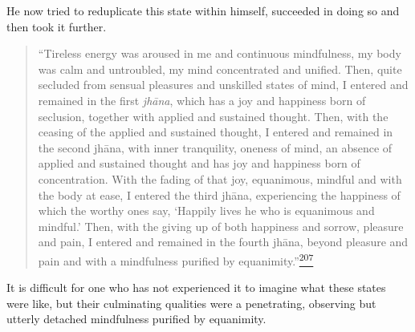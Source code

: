 He now tried to reduplicate this state within himself, succeeded in
doing so and then took it further.

\begin{quote}
``Tireless energy was aroused in me and continuous mindfulness, my body
was calm and untroubled, my mind concentrated and unified. Then, quite
secluded from sensual pleasures and unskilled states of mind, I entered
and remained in the first \emph{jhāna}, which has a joy and happiness
born of seclusion, together with applied and sustained thought. Then,
with the ceasing of the applied and sustained thought, I entered and
remained in the second jhāna, with inner tranquility, oneness of mind,
an absence of applied and sustained thought and has joy and happiness
born of concentration. With the fading of that joy, equanimous, mindful
and with the body at ease, I entered the third jhāna, experiencing the
happiness of which the worthy ones say, `Happily lives he who is
equanimous and mindful.' Then, with the giving up of both happiness and
sorrow, pleasure and pain, I entered and remained in the fourth jhāna,
beyond pleasure and pain and with a mindfulness purified by
equanimity.''\label{footprints_split_009.html_fnref207}\hyperref[footprints_split_024.htmlux5cux23fn207]{\textsuperscript{207}}
\end{quote}

It is difficult for one who has not experienced it to imagine what these
states were like, but their culminating qualities were a penetrating,
observing but utterly detached mindfulness purified by equanimity.

